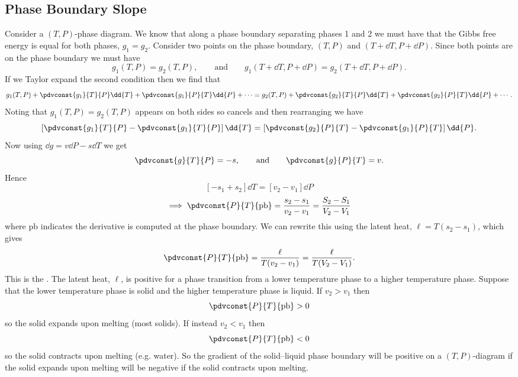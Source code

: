     \subsection{Phase Boundary Slope}
    Consider a \((T, P)\)-phase diagram.
    We know that along a phase boundary separating phases 1 and 2 we must have that the Gibbs free energy is equal for both phases, \(g_1 = g_2\).
    Consider two points on the phase boundary, \((T, P)\) and \((T + \dd{T}, P + \dd{P})\).
    Since both points are on the phase boundary we must have
    \[g_1(T, P) = g_2(T, P), \qquad\text{and}\qquad g_1(T + \dd{T}, P + \dd{P}) = g_2(T + \dd{T}, P + \dd{P}).\]
    If we Taylor expand the second condition then we find that
    \[g_1(T, P) + \pdvconst{g_1}{T}{P}\dd{T} + \pdvconst{g_1}{P}{T}\dd{P} + \dotsb = g_2(T, P) + \pdvconst{g_2}{T}{P}\dd{T} + \pdvconst{g_2}{P}{T}\dd{P} + \dotsb.\]
    Noting that \(g_1(T, P) = g_2(T, P)\) appears on both sides so cancels and then rearranging we have
    \[\left[\pdvconst{g_1}{T}{P} - \pdvconst{g_1}{T}{P}\right]\dd{T} = \left[\pdvconst{g_2}{P}{T} - \pdvconst{g_1}{P}{T}\right]\dd{P}.\]
    Now using \(\dd{g} = v\dd{P} - s\dd{T}\) we get
    \[\pdvconst{g}{T}{P} = -s, \qquad\text{and}\qquad \pdvconst{g}{P}{T} = v.\]
    Hence
    \[[-s_1 + s_2]\dd{T} = [v_2 - v_1]\dd{P}\]
    \[\implies \pdvconst{P}{T}{\mathrm{pb}} = \frac{s_2 - s_1}{v_2 - v_1} = \frac{S_2 - S_1}{V_2 - V_1}\]
    where \(\mathrm{pb}\) indicates the derivative is computed at the phase boundary.
    We can rewrite this using the latent heat, \(\ell = T(s_2 - s_1)\), which gives
    \[\pdvconst{P}{T}{\mathrm{pb}} = \frac{\ell}{T(v_2 - v_1)} = \frac{\ell}{T(V_2 - V_1)}.\]
    This is the .
    The latent heat, \(\ell\), is positive for a phase transition from a lower temperature phase to a higher temperature phase.
    Suppose that the lower temperature phase is solid and the higher temperature phase is liquid.
    If \(v_2 > v_1\) then
    \[\pdvconst{P}{T}{\mathrm{pb}} > 0\]
    so the solid expands upon melting (most solids).
    If instead \(v_2 < v_1\) then
    \[\pdvconst{P}{T}{\mathrm{pb}} < 0\]
    so the solid contracts upon melting (e.g. water).
    So the gradient of the solid--liquid phase boundary will be positive on a \((T, P)\)-diagram if the solid expands upon melting will be negative if the solid contracts upon melting.
    
